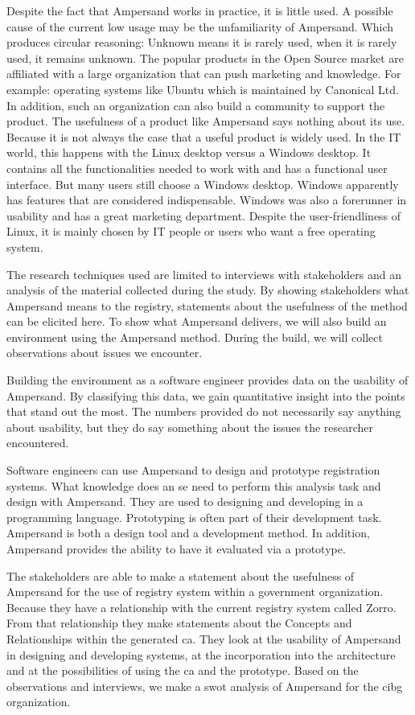 Despite the fact that Ampersand works in practice, it is little used.
A possible cause of the current low usage may be the unfamiliarity of Ampersand.
Which produces circular reasoning:
Unknown means it is rarely used, when it is rarely used, it remains unknown.
The popular products in the Open Source market are affiliated with a large organization that can push marketing and knowledge. 
For example: operating systems like Ubuntu which is maintained by Canonical Ltd.
In addition, such an organization can also build a community to support the product.
The usefulness of a product like Ampersand says nothing about its use.
Because it is not always the case that a useful product is widely used.
In the IT world, this happens with the Linux desktop versus a Windows desktop.
It contains all the functionalities needed to work with and has a functional user interface.
But many users still choose a Windows desktop.
Windows apparently has features that are considered indispensable.
Windows was also a forerunner in usability and has a great marketing department.
Despite the user-friendliness of Linux, it is mainly chosen by IT people or users who want a free operating system.


The research techniques used are limited to interviews with stakeholders and an analysis of the material collected during the study.
By showing stakeholders what Ampersand means to the registry, statements about the usefulness of the method can be elicited here.
To show what Ampersand delivers, we will also build an environment using the Ampersand method.
During the build, we will collect observations about issues we encounter.

Building the environment as a software engineer provides data on the usability of Ampersand.
By classifying this data, we gain quantitative insight into the points that stand out the most.
The numbers provided do not necessarily say anything about usability, but they do say something about the issues the researcher encountered.

Software engineers can use Ampersand to design and prototype registration systems.
What knowledge does an \acrlong{se} need to perform this analysis task and design with Ampersand.
They are used to designing and developing in a programming language.
Prototyping is often part of their development task.
Ampersand is both a design tool and a development method.
In addition, Ampersand provides the ability to have it evaluated via a prototype.

The stakeholders are able to make a statement about the usefulness of Ampersand for the use of registry system within a government organization.
Because they have a relationship with the current registry system called Zorro.
From that relationship they make statements about the Concepts and Relationships within the generated \acrlong{ca}.
They look at the usability of Ampersand in designing and developing systems, at the incorporation into the architecture and  at the possibilities of using the \acrlong{ca} and the prototype.
Based on the observations and interviews, we make a swot analysis of Ampersand for the \acrshort{cibg} organization.

